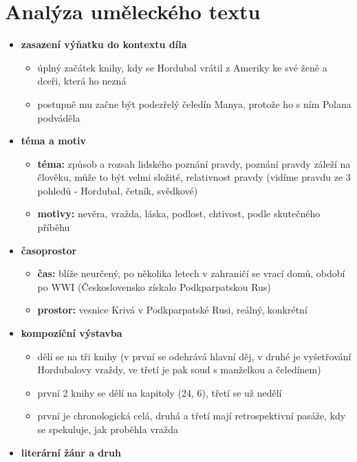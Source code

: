 \documentclass[11pt]{article}
\begin{document}
    \section*{Analýza uměleckého textu}
    \begin{itemize}
        \item\textbf{zasazení výňatku do kontextu díla}
        \begin{itemize}
            \item úplný začátek knihy, kdy se Hordubal vrátil z Ameriky ke své ženě a dceři, která ho nezná
            \item postupně mu začne být podezřelý čeledín Manya, protože ho s ním Polana podváděla
        \end{itemize}
        \item\textbf{téma a motiv}
        \begin{itemize}
            \item\textbf{téma: }způsob a rozsah lidského poznání pravdy, poznání pravdy záleží na člověku, může to být velmi složité, relativnost pravdy (vidíme pravdu ze 3 pohledů - Hordubal, četník, svědkové)
            \item\textbf{motivy: }nevěra, vražda, láska, podlost, chtivost, podle skutečného příběhu
        \end{itemize}
        \item\textbf{časoprostor}
        \begin{itemize}
            \item\textbf{čas: }blíže neurčený, po několika letech v zahraničí se vrací domů, období po WWI (Československo získalo Podkparpatskou Rus)
            \item\textbf{prostor: }vesnice Krivá v Podkparpatské Rusi, reálný, konkrétní
        \end{itemize}
        \item\textbf{kompoziční výstavba}
        \begin{itemize}
            \item dělí se na tři knihy (v první se odehrává hlavní děj, v druhé je vyšetřování Hordubalovy vraždy, ve třetí je pak soud s manželkou a čeledínem)
            \item první 2 knihy se dělí na kapitoly (24, 6), třetí se už nedělí
            \item první je chronologická celá, druhá a třetí mají retrospektivní pasáže, kdy se spekuluje, jak proběhla vražda
        \end{itemize}
        \item\textbf{literární žánr a druh}

\end{itemize}
\end{document}
